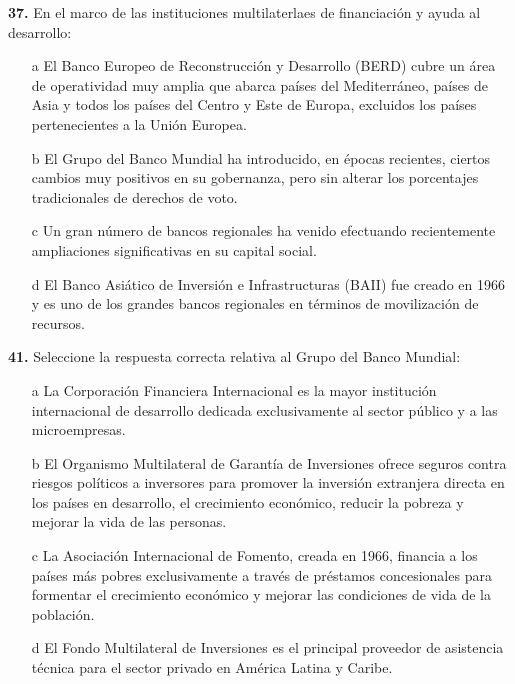 \documentclass{nuevotema}
\begin{document}
\textbf{37.} En el marco de las instituciones multilaterlaes de financiación y ayuda al desarrollo:

\begin{itemize}
	\item[a] El Banco Europeo de Reconstrucción y Desarrollo (BERD) cubre un área de operatividad muy amplia que abarca países del Mediterráneo, países de Asia y todos los países del Centro y Este de Europa, excluidos los países pertenecientes a la Unión Europea.
	\item[b] El Grupo del Banco Mundial ha introducido, en épocas recientes, ciertos cambios muy positivos en su gobernanza, pero sin alterar los porcentajes tradicionales de derechos de voto.
	\item[c] Un gran número de bancos regionales ha venido efectuando recientemente ampliaciones significativas en su capital social.
	\item[d] El Banco Asiático de Inversión e Infrastructuras (BAII) fue creado en 1966 y es uno de los grandes bancos regionales en términos de movilización de recursos.
\end{itemize}


\textbf{41.} Seleccione la respuesta correcta relativa al Grupo del Banco Mundial:

\begin{itemize}
	\item[a] La Corporación Financiera Internacional es la mayor institución internacional de desarrollo dedicada exclusivamente al sector público y a las microempresas.
	\item[b] El Organismo Multilateral de Garantía de Inversiones ofrece seguros contra riesgos políticos a inversores para promover la inversión extranjera directa en los países en desarrollo, el crecimiento económico, reducir la pobreza y mejorar la vida de las personas.
	\item[c] La Asociación Internacional de Fomento, creada en 1966, financia a los países más pobres exclusivamente a través de préstamos concesionales para formentar el crecimiento económico y mejorar las condiciones de vida de la población.
	\item[d] El Fondo Multilateral de Inversiones es el principal proveedor de asistencia técnica para el sector privado en América Latina y Caribe.
\end{itemize}

\end{document}

